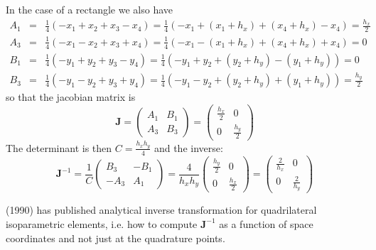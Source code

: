 In the case of a rectangle we also have
\begin{eqnarray}
A_1&=&\frac14(-x_1 +x_2 +x_3 -x_4)=\frac14(-x_1 +(x_1+h_x) +(x_4+h_x) -x_4) = \frac{h_x}{2} \\
A_3&=&\frac14(-x_1 -x_2 +x_3 +x_4)=\frac14( -x_1 -(x_1+h_x) +(x_4+h_x) +x_4)  = 0 \\
B_1 &=& \frac14 (-y_1 +y_2 +y_3 -y_4) = \frac14(-y_1 + y_2 + (y_2 +h_y) - (y_1+h_y)) = 0\\
B_3&=& \frac14(-y_1 -y_2 +y_3 +y_4) = \frac14 (-y_1 -y_2 + (y_2+h_y)+ (y_1+h_y)) = \frac{h_y}{2}
\end{eqnarray}
so that the jacobian matrix is 
\[
{\bm J} 
= \left(
\begin{array}{cc}
A_1  & B_1  \\
A_3  & B_3 
\end{array}
\right)
= \left(
\begin{array}{cc}
\frac{h_x}{2}  & 0  \\
0  & \frac{h_y}{2}
\end{array}
\right)
\]
The determinant is then $C=\frac{h_xh_y}{4}$ and the inverse:
\[
{\bm J}^{-1}
= 
\frac{1}{C}
\left(
\begin{array}{cc}
B_3  & -B_1  \\
-A_3  & A_1
\end{array}
\right)
= 
\frac{4}{h_xh_y}
\left(
\begin{array}{cc}
\frac{h_y}{2}  & 0  \\
0  & \frac{h_x}{2}
\end{array}
\right)
=
\left(
\begin{array}{cc}
\frac{2}{h_x}  & 0  \\
0  & \frac{2}{h_y}
\end{array}
\right)
\]











\begin{remark}
\textcite{hua90} (1990) has published analytical inverse transformation 
for quadrilateral isoparametric elements, i.e. how to compute ${\bm J}^{-1}$ 
as a function of space coordinates and not just at the quadrature points. 
\end{remark}







